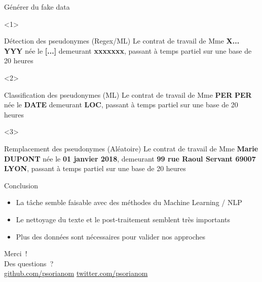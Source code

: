 \documentclass[10pt]{beamer}
\begin{document}
\begin{frame}{Générer du fake data}

\begin{onlyenv}<1>
	\begin{block}{Détection des pseudonymes (Regex/ML)}
		\vspace{1cm}
		Le contrat de travail de Mme \textbf{X...} \textbf{YYY} née le \textbf{[...]} demeurant \textbf{xxxxxxx}, passant à temps partiel
	sur une base de 20 heures 
	\end{block}
\end{onlyenv}
\begin{onlyenv}<2>
	\begin{block}{Classification des pseudonymes (ML)}
		\vspace{1cm}
		Le contrat de travail de Mme \textbf{PER} \textbf{PER} née le \textbf{DATE} demeurant \textbf{LOC}, passant à temps partiel
		sur une base de 20 heures 
	\end{block}
\end{onlyenv}

\begin{onlyenv}<3>
	\begin{block}{Remplacement des pseudonymes (Aléatoire)}
		\vspace{1cm}
		Le contrat de travail de Mme \textbf{Marie} \textbf{DUPONT} née le \textbf{01 janvier 2018}, demeurant \textbf{99 rue Raoul Servant 69007 LYON}, passant à temps partiel
		sur une base de 20 heures 
	\end{block}
\end{onlyenv}


\end{frame}

\begin{frame}{Conclusion}


\begin{itemize}
	\item La tâche semble faisable avec des méthodes du Machine Learning / NLP
	\item Le nettoyage du texte et le post-traitement semblent très importants
	\item Plus des données sont nécessaires pour valider nos approches 
\end{itemize}

\end{frame}
\begin{frame}[standout]

 Merci~! \\ 
 Des questions~?\\
 
 \vspace{1cm}
 \url{github.com/psorianom}  
 \url{twitter.com/psorianom} 
\end{frame}
\end{document}
